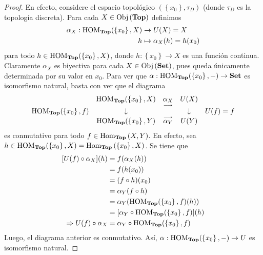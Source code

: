\documentclass[12pt]{report}
\theoremstyle{largebreak}
\newcommand\cf[3]{\ensuremath{#1:#2\rightarrow#3}}
\newcommand{\Obj}[1]{\ensuremath{\textup{Obj}\left(#1\right)}}
\newcommand{\Hom}[3]{\ensuremath{\textup{Hom}_{#1}\left(#2,#3\right)}}
\newcommand{\Cat}[1]{\ensuremath{\textup{\textbf{#1}}}}
\begin{document}
    \begin{proof}
        En efecto, considere el espacio topológico $(\left\{x_0\right\},\tau_D)$ (donde $\tau_D$ es la topología discreta). Para cada $X\in\Obj{\Cat{Top}}$ definimos
        \begin{equation*}
            \begin{split}
                \alpha_X:\HOM{\Cat{Top}}(\left\{x_0\right\},X)&\rightarrow U(X)=X\\
                h&\mapsto \alpha_X(h)=h(x_0)\\
            \end{split}
        \end{equation*}
        para todo $h\in\HOM{\Cat{Top}}(\left\{x_0\right\},X)$, donde $\cf{h}{\left\{x_0 \right\}}{X}$ es una función continua. Claramente $\alpha_X$ es biyectiva para cada $X\in\Obj{\Cat{Set}}$, pues queda únicamente determinada por su valor en $x_0$. Para ver que $\cf{\alpha}{\HOM{\Cat{Top}}(\left\{x_0\right\},-)}{\Cat{Set}}$ es isomorfismo natural, basta con ver que el diagrama
        \begin{equation*}
            \begin{array}{rcccl}
                & \HOM{\Cat{Top}}(\left\{x_0\right\},X) & \underset{\longrightarrow}{\alpha_{X}} & U(X) &\\
                \HOM{\Cat{Top}}(\left\{x_0\right\},f) & \downarrow & & \downarrow & U(f)=f \\
                & \HOM{\Cat{Top}}(\left\{x_0\right\},Y) & \overset{\longrightarrow}{\alpha_{Y}} & U(Y) &\\
            \end{array}
        \end{equation*}
        es conmutativo para todo $f\in\Hom{\Cat{Top}}{X}{Y}$. En efecto, sea $h\in\HOM{\Cat{Top}}(\left\{x_0\right\},X)=\Hom{\Cat{Top}}{\left\{x_0\right\}}{X}$. Se tiene que
        \begin{equation*}
            \begin{split}
                [U(f)\circ\alpha_X](h)&=f(\alpha_X(h))\\
                &=f(h(x_0))\\
                &=(f\circ h)(x_0)\\
                &=\alpha_Y(f\circ h)\\
                &=\alpha_Y(\HOM{\Cat{Top}}(\left\{x_0\right\},f)(h))\\
                &=[\alpha_Y\circ\HOM{\Cat{Top}}(\left\{x_0\right\},f)](h)\\
                \Rightarrow U(f)\circ\alpha_X&=\alpha_Y\circ\HOM{\Cat{Top}}(\left\{x_0\right\},f)\\
            \end{split}
        \end{equation*}
        Luego, el diagrama anterior es conmutativo. Así, $\cf{\alpha}{\HOM{\Cat{Top}}(\left\{x_0\right\},-)}{U}$ es isomorfismo natural.
    \end{proof}
\end{document}

